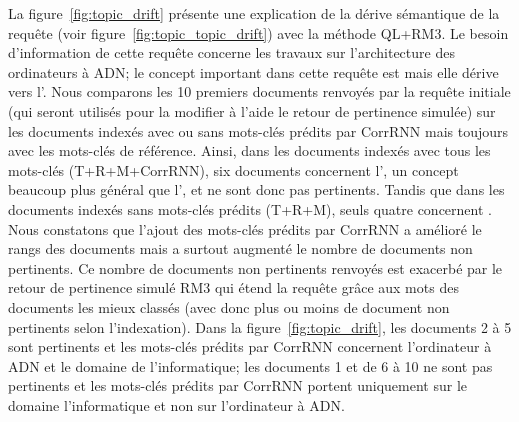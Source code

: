 La figure~\ref{fig:topic_drift} présente une explication de la dérive sémantique de la requête  (voir figure~\ref{fig:topic_topic_drift}) avec la méthode QL+RM3.
Le besoin d'information de cette requête concerne les travaux sur l'architecture des ordinateurs à ADN; le concept important dans cette requête est  mais elle dérive vers l'.
Nous comparons les 10 premiers documents renvoyés par la requête initiale (qui seront utilisés pour la modifier à l'aide le retour de pertinence simulée) sur les documents indexés avec ou sans mots-clés prédits par CorrRNN mais toujours avec les mots-clés de référence.
Ainsi, dans les documents indexés avec tous les mots-clés (T+R+M+CorrRNN), six documents concernent l', un concept beaucoup plus général que l', et ne sont donc pas pertinents.
Tandis que dans les documents indexés sans mots-clés prédits (T+R+M), seuls quatre concernent .
Nous constatons que l'ajout des mots-clés prédits par CorrRNN a amélioré le rangs des documents mais a surtout augmenté le nombre de documents non pertinents.
Ce nombre de documents non pertinents renvoyés est exacerbé par le retour de pertinence simulé RM3 qui étend la requête grâce aux mots des documents les mieux classés (avec donc plus ou moins de document non pertinents selon l'indexation).
Dans la figure~\ref{fig:topic_drift}, les documents 2 à 5 sont pertinents et les mots-clés prédits par CorrRNN concernent l'ordinateur à ADN et le domaine de l'informatique; les documents 1 et de 6 à 10 ne sont pas pertinents et les mots-clés prédits par CorrRNN portent uniquement sur le domaine l'informatique et non sur l'ordinateur à ADN.


